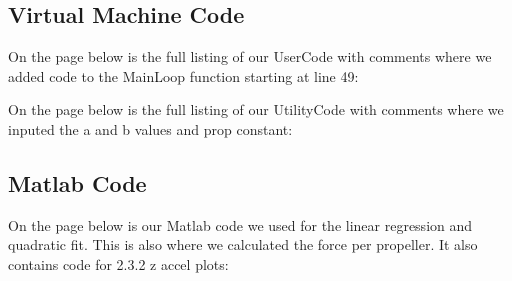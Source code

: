 \documentclass{article}
\begin{document}
\subsection{Virtual Machine Code}

On the page below is the full listing of our UserCode with comments where we added code to the MainLoop function starting at line 49:


On the page below is the full listing of our UtilityCode with comments where we inputed the a and b values and prop constant:


\subsection{Matlab Code}
On the page below is our Matlab code we used for the linear regression and quadratic fit. This is also where we calculated the force per propeller. It also contains code for 2.3.2 z accel plots:


\end{document}
